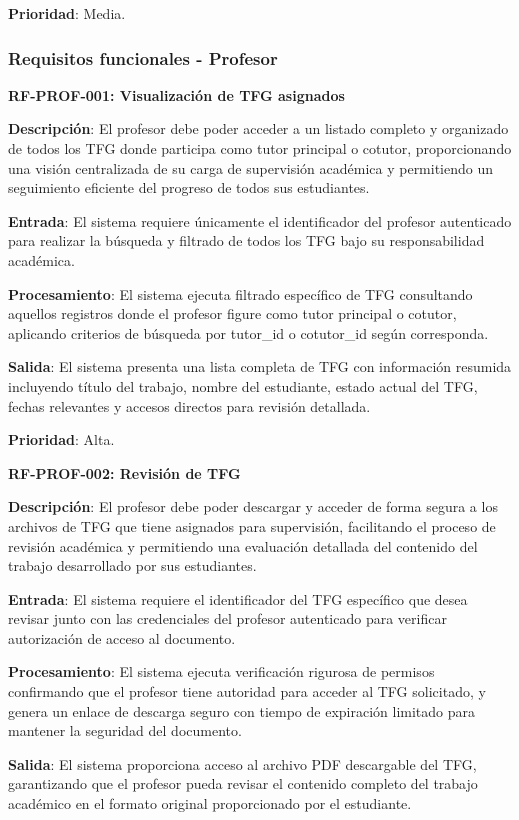 \documentclass[12pt,a4paper,oneside]{report}
\begin{document}
\textbf{Prioridad}: Media.

\subsubsection{Requisitos funcionales -
Profesor}\label{requisitos-funcionales---profesor}

\textbf{RF-PROF-001: Visualización de TFG asignados}

\textbf{Descripción}: El profesor debe poder acceder a un listado completo y organizado de todos los TFG donde participa como tutor principal o cotutor, proporcionando una visión centralizada de su carga de supervisión académica y permitiendo un seguimiento eficiente del progreso de todos sus estudiantes.

\textbf{Entrada}: El sistema requiere únicamente el identificador del profesor autenticado para realizar la búsqueda y filtrado de todos los TFG bajo su responsabilidad académica.

\textbf{Procesamiento}: El sistema ejecuta filtrado específico de TFG consultando aquellos registros donde el profesor figure como tutor principal o cotutor, aplicando criterios de búsqueda por tutor\_id o cotutor\_id según corresponda.

\textbf{Salida}: El sistema presenta una lista completa de TFG con información resumida incluyendo título del trabajo, nombre del estudiante, estado actual del TFG, fechas relevantes y accesos directos para revisión detallada.

\textbf{Prioridad}: Alta.

\textbf{RF-PROF-002: Revisión de TFG}

\textbf{Descripción}: El profesor debe poder descargar y acceder de forma segura a los archivos de TFG que tiene asignados para supervisión, facilitando el proceso de revisión académica y permitiendo una evaluación detallada del contenido del trabajo desarrollado por sus estudiantes.

\textbf{Entrada}: El sistema requiere el identificador del TFG específico que desea revisar junto con las credenciales del profesor autenticado para verificar autorización de acceso al documento.

\textbf{Procesamiento}: El sistema ejecuta verificación rigurosa de permisos confirmando que el profesor tiene autoridad para acceder al TFG solicitado, y genera un enlace de descarga seguro con tiempo de expiración limitado para mantener la seguridad del documento.

\textbf{Salida}: El sistema proporciona acceso al archivo PDF descargable del TFG, garantizando que el profesor pueda revisar el contenido completo del trabajo académico en el formato original proporcionado por el estudiante.
\end{document}

